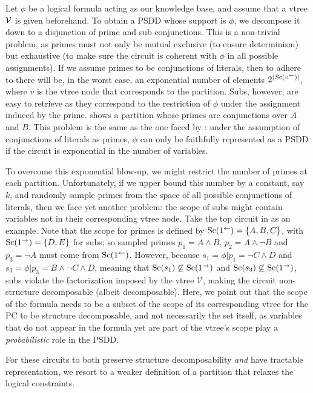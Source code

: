 Let $\phi$ be a logical formula acting as our knowledge base, and assume that a vtree $\operatorname{\mathcal{V}}$ is
given beforehand. To obtain a PSDD whose support is $\phi$, we decompose it down to a disjunction of
prime and sub conjunctions. This is a non-trivial problem, as primes must not only be mutual
exclusive (to ensure determinism) but exhaustive (to make sure the circuit is coherent with $\phi$
in all possible assignments). If we assume primes to be conjunctions of literals, then to adhere to
 there will be, in the worst case, an exponential number of elements
$2^{|\operatorname*{\normalfont{Sc}}(v^\gets)|}$, where $v$ is the vtree node that corresponds to the partition. Subs, however,
are easy to retrieve as they correspond to the restriction of $\phi$ under the assignment induced
by the prime.  shows a partition whose primes are conjunctions over $A$ and
$B$. This problem is the same as the one faced by \citet{geh20}: under the assumption of
conjunctions of literals as primes, $\phi$ can only be faithfully represented as a PSDD if the
circuit is exponential in the number of variables.

To overcome this exponential blow-up, we might restrict the number of primes at each partition.
Unfortunately, if we upper bound this number by a constant, say $k$, and randomly sample primes from the
space of all possible conjunctions of literals, then we face yet another problem: the scope of subs
might contain variables not in their corresponding vtree node. Take the top circuit in
 as an example. Note that the scope for primes is defined by
$\operatorname*{\normalfont{Sc}}(1^\gets)=\{A,B,C\}$, with $\operatorname*{\normalfont{Sc}}(1^\to)=\{D,E\}$ for subs; so sampled primes $p_1=A\wedge B$,
$p_2=A\wedge\neg B$ and $p_3=\neg A$ must come from $\operatorname*{\normalfont{Sc}}(1^\gets)$. However, because
$s_1=\phi|p_1=\neg C\wedge D$ and $s_3=\phi|p_3=B\wedge\neg C \wedge D$, meaning that
$\operatorname*{\normalfont{Sc}}(s_1)\not\subseteq\operatorname*{\normalfont{Sc}}(1^\to)$ and $\operatorname*{\normalfont{Sc}}(s_3)\not\subseteq\operatorname*{\normalfont{Sc}}(1^\to)$, subs violate the
factorization imposed by the vtree $\mathcal{V}$, making the circuit non-structure decomposable
(albeit decomposable). Here, we point out that the scope of the formula needs to be a subset of the
scope of its corresponding vtree for the PC to be structure decomposable, and not necessarily
the set itself, as variables that do not appear in the formula yet are part of the vtree's scope
play a \emph{probabilistic} role in the PSDD.

For these circuits to both preserve structure decomposability \emph{and} have tractable
representation, we resort to a weaker definition of a partition that relaxes the logical
constraints.

